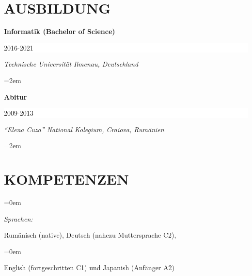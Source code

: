 \documentclass[paper=a4,fontsize=10.47pt]{scrartcl} %
\newlength{\spacebox}
\newcommand{\sepspace}{\vspace*{0.5em}}		%
\newcommand{\NewPart}[1]{\section*{\uppercase{#1}}}
\newcommand{\PersonalEntry}[2]{
		\noindent\hangindent=0em\hangafter=0 %
		\parbox{\spacebox}{        %
		\mbox {\textit{#1}}}		       %
		\hspace{5em} #2 \par}    %
\newcommand{\SkillsEntry}[2]{      %
		\noindent\hangindent=0em\hangafter=0 %
		\parbox{\spacebox}{        %
		\mbox{\textit{#1}}}			   %
		\hspace{6em} #2 \par}    %
\newcommand{\EducationEntry}[4]{
		\noindent \textbf{#1} \hfill      %
		\colorbox{White}{%
			\parbox{16em}{%
			\hfill\color{Black}#2}} \par  %
		\noindent \textit{#3} \par        %
		\noindent\hangindent=2em\hangafter=0 \small #4 %
		\normalsize \par}
\begin{document}
\NewPart{Ausbildung}{}
\EducationEntry{\color[HTML]{6a040f}Informatik (Bachelor of Science)}{2016-2021}{Technische Universität Ilmenau, Deutschland}{%
}

 \sepspace

\EducationEntry{\color[HTML]{6a040f}Abitur}{2009-2013}{“Elena Cuza” National Kolegium, Craiova, Rumänien}{%
}


%




\NewPart{KOMPETENZEN}{}

\SkillsEntry{Sprachen:}{Rumänisch (native), Deutsch (nahezu Muttersprache C2),  }
\SkillsEntry{}{English (fortgeschritten C1) und Japanish (Anfänger A2)}
\end{document}
